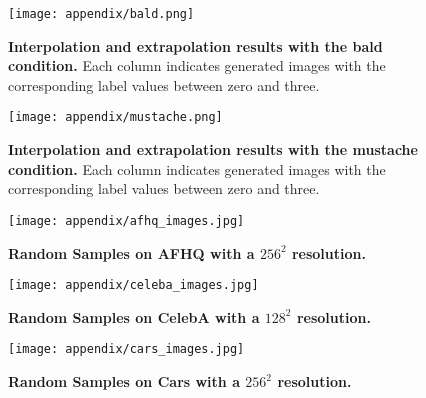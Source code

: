 \documentclass[nohyperref]{article}
\theoremstyle{plain}
\theoremstyle{definition}
\theoremstyle{remark}
\begin{document}
\begin{figure}[h]
\begin{center}
\centerline{\texttt{[image: appendix/bald.png]}}
\caption{\textbf{Interpolation and extrapolation results with the bald condition.} Each column indicates generated images with the corresponding label values between zero and three.}
\label{figure_19}
\end{center}
\vskip -0.2in
\end{figure}


\begin{figure}[h]
\begin{center}
\centerline{\texttt{[image: appendix/mustache.png]}}
\caption{\textbf{Interpolation and extrapolation results with the mustache condition.} Each column indicates generated images with the corresponding label values between zero and three.}
\label{figure_20}
\end{center}
\vskip -0.2in
\end{figure}




\begin{figure}[ht]
\begin{center}
\centerline{\texttt{[image: appendix/afhq\_images.jpg]}}
\caption{\textbf{Random Samples on AFHQ with a $256^{2}$ resolution.}}
\label{figure_21}
\end{center}
\vskip -0.2in
\end{figure}


\begin{figure}[ht]
\begin{center}
\centerline{\texttt{[image: appendix/celeba\_images.jpg]}}
\caption{\textbf{Random Samples on CelebA with a $128^{2}$ resolution.}}
\label{figure_22}
\end{center}
\vskip -0.2in
\end{figure}



\begin{figure}[ht]
\begin{center}
\centerline{\texttt{[image: appendix/cars\_images.jpg]}}
\caption{\textbf{Random Samples on Cars with a $256^{2}$ resolution.}}
\label{figure_23}
\end{center}
\vskip -0.2in
\end{figure}
\end{document}
